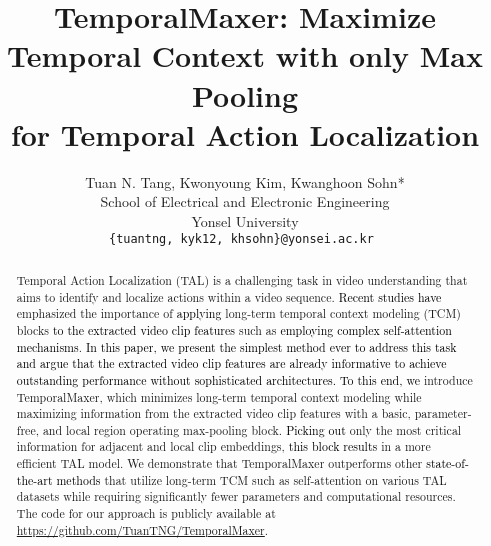 \documentclass[10pt,twocolumn,letterpaper]{article}
\newcommand{\ky}[1]{\textcolor{black}{{#1}}}
\begin{document}
\title{TemporalMaxer: Maximize Temporal Context with only Max Pooling \\ for Temporal Action Localization}

\author{Tuan N. Tang, Kwonyoung Kim, Kwanghoon Sohn* \\
	School of Electrical and Electronic Engineering \\
	Yonsel University \\
	{\tt\small \{tuantng, kyk12, khsohn\}@yonsei.ac.kr
}
}
\maketitle
\begin{abstract}





Temporal Action Localization (TAL) is a challenging task in video understanding that aims to identify and localize actions within a video sequence. 
\ky{Recent studies have} emphasized the importance of \ky{applying} long-term temporal context modeling (TCM) blocks \ky{to the extracted video clip features} such as \ky{employing complex self-attention mechanisms}. 
\ky{In this paper, we present the simplest method ever to address this task and argue that the extracted video clip features are already informative to achieve outstanding performance without sophisticated architectures.}
\ky{To this end, we} introduce TemporalMaxer, which minimizes long-term temporal context modeling while maximizing information from the extracted video clip features with a basic, parameter-free, and local region operating max-pooling block. 
\ky{Picking out} only the most critical information for adjacent and local clip embeddings, \ky{this block results} in a more efficient TAL model.
We demonstrate that TemporalMaxer outperforms other \ky{state-of-the-art methods} that utilize long-term TCM such as self-attention on various TAL datasets while requiring significantly fewer parameters and computational resources.
The code for our approach is publicly available at \url{https://github.com/TuanTNG/TemporalMaxer}.

\end{abstract} 
\end{document}
